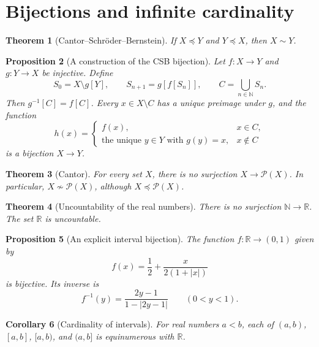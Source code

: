 \documentclass[11pt]{article}
\newtheorem{theorem}{Theorem}[section]
\newtheorem{proposition}[theorem]{Proposition}
\newtheorem{corollary}[theorem]{Corollary}
\theoremstyle{definition}
\newcommand{\Pow}{\mathcal P}
\newcommand{\N}{\mathbb N}
\newcommand{\R}{\mathbb R}
\begin{document}
\newpage
\section{Bijections and infinite cardinality}
\begin{theorem}[Cantor--Schr\"oder--Bernstein]
If $X\preccurlyeq Y$ and $Y\preccurlyeq X$, then $X\sim Y$.
\end{theorem}
\begin{proposition}[A construction of the CSB bijection]
Let $f:X\to Y$ and $g:Y\to X$ be injective. Define
\[
S_0=X\setminus g[Y],\qquad S_{n+1}=g[f[S_n]],\qquad
C=\bigcup_{n\in\N}S_n.
\]
Then $g^{-1}[C]=f[C]$. Every $x\in X\setminus C$ has a unique
preimage under $g$, and the function
\[
h(x)=\begin{cases}
f(x),&x\in C,\\
\text{the unique }y\in Y\text{ with }g(y)=x,&x\notin C
\end{cases}
\]
is a bijection $X\to Y$.
\end{proposition}
\begin{theorem}[Cantor]
For every set $X$, there is no surjection $X\to\Pow(X)$.
In particular, $X\not\sim\Pow(X)$, although $X\preccurlyeq\Pow(X)$.
\end{theorem}
\begin{theorem}[Uncountability of the real numbers]
There is no surjection $\N\to\R$. The set $\R$ is uncountable.
\end{theorem}
\begin{proposition}[An explicit interval bijection]
The function $f:\R\to(0,1)$ given by
\[
f(x)=\frac12+\frac{x}{2(1+|x|)}
\]
is bijective. Its inverse is
\[
f^{-1}(y)=\frac{2y-1}{1-|2y-1|}\qquad(0<y<1).
\]
\end{proposition}
\begin{corollary}[Cardinality of intervals]
For real numbers $a<b$, each of $(a,b)$, $[a,b]$, $[a,b)$,
and $(a,b]$ is equinumerous with $\R$.
\end{corollary}

\newpage
\end{document}
